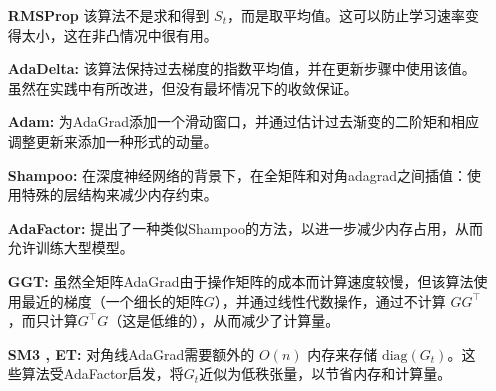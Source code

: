\begin{itemize}

\item[\bf{RMSProp}] 该算法不是求和得到 $S_t$，而是取平均值。这可以防止学习速率变得太小，这在非凸情况中很有用。

\item[\bf{AdaDelta}:] 
该算法保持过去梯度的指数平均值，并在更新步骤中使用该值。 虽然在实践中有所改进，但没有最坏情况下的收敛保证。
		
\item[\bf{Adam}:] 
为AdaGrad添加一个滑动窗口，并通过估计过去渐变的二阶矩和相应调整更新来添加一种形式的动量。
		
\item[\bf{Shampoo}:] 
在深度神经网络的背景下，在全矩阵和对角adagrad之间插值：使用特殊的层结构来减少内存约束。

\item[\bf{AdaFactor}:] 
提出了一种类似Shampoo的方法，以进一步减少内存占用，从而允许训练大型模型。
		
\item[\bf{GGT}:] 
虽然全矩阵AdaGrad由于操作矩阵的成本而计算速度较慢，但该算法使用最近的梯度（一个细长的矩阵$G$），并通过线性代数操作，通过不计算 $GG^\top$，而只计算$G^\top G$（这是低维的），从而减少了计算量。

\item[\bf{SM3 , ET}:] 
对角线AdaGrad需要额外的 $O(n)$ 内存来存储  $\text{diag}(G_t)$。这些算法受AdaFactor启发，将$G_t$近似为低秩张量，以节省内存和计算量。



\end{itemize}
	




